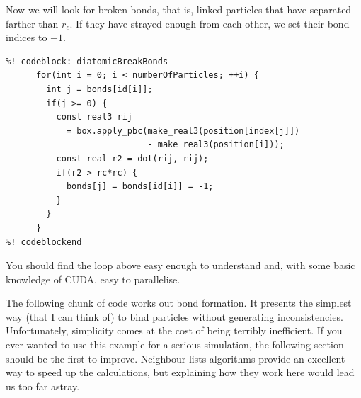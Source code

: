 Now we will look for broken bonds, that is, linked particles that have separated 
farther than $r_c$. If they have strayed enough from each other, we set their
bond indices to $-1$.
\begin{lstlisting}
%! codeblock: diatomicBreakBonds
      for(int i = 0; i < numberOfParticles; ++i) {
        int j = bonds[id[i]];
        if(j >= 0) {
          const real3 rij
            = box.apply_pbc(make_real3(position[index[j]])
                            - make_real3(position[i]));
          const real r2 = dot(rij, rij);
          if(r2 > rc*rc) {
            bonds[j] = bonds[id[i]] = -1;
          }
        }
      }
%! codeblockend
\end{lstlisting}
You should find the loop above easy enough to understand and, with some basic 
knowledge of CUDA, easy to parallelise.

The following chunk of code works out bond formation. It presents the simplest 
way (that I can think of) to bind particles without generating inconsistencies. 
Unfortunately, simplicity comes at the cost of being terribly inefficient. If 
you ever wanted to use this example for a serious simulation, the following 
section should be the first to improve. Neighbour lists algorithms provide an 
excellent way to speed up the calculations, but explaining how they work here 
would lead us too far astray.

